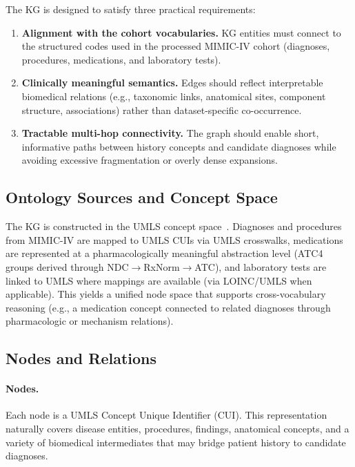 The KG is designed to satisfy three practical requirements:
\begin{enumerate}
    \item \textbf{Alignment with the cohort vocabularies.} KG entities must connect to the structured codes used in the processed MIMIC-IV cohort (diagnoses, procedures, medications, and laboratory tests).
    \item \textbf{Clinically meaningful semantics.} Edges should reflect interpretable biomedical relations (e.g., taxonomic links, anatomical sites, component structure, associations) rather than dataset-specific co-occurrence.
    \item \textbf{Tractable multi-hop connectivity.} The graph should enable short, informative paths between history concepts and candidate diagnoses while avoiding excessive fragmentation or overly dense expansions.
\end{enumerate}

\subsection{Ontology Sources and Concept Space}
\label{subsec:kg-sources}

The KG is constructed in the UMLS concept space~\cite{bodenreider2004umls}. Diagnoses and procedures from MIMIC-IV are mapped to UMLS CUIs via UMLS crosswalks, medications are represented at a pharmacologically meaningful abstraction level (ATC4 groups derived through NDC$\rightarrow$RxNorm$\rightarrow$ATC), and laboratory tests are linked to UMLS where mappings are available (via LOINC/UMLS when applicable). This yields a unified node space that supports cross-vocabulary reasoning (e.g., a medication concept connected to related diagnoses through pharmacologic or mechanism relations).

\subsection{Nodes and Relations}
\label{subsec:kg-nodes-relations}

\paragraph{Nodes.}
Each node is a UMLS Concept Unique Identifier (CUI). This representation naturally covers disease entities, procedures, findings, anatomical concepts, and a variety of biomedical intermediates that may bridge patient history to candidate diagnoses.

